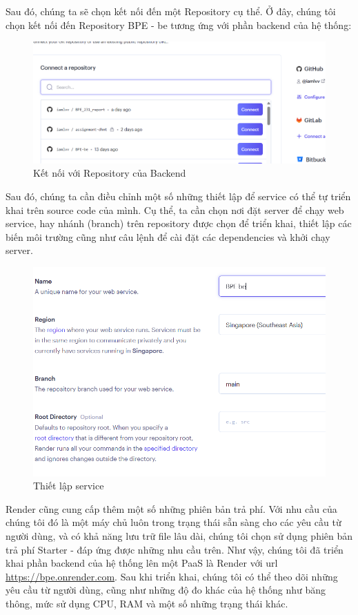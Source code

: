 Sau đó, chúng ta sẽ chọn kết nối đến một Repository cụ thể. Ở đây, chúng tôi chọn kết nối đến Repository BPE - be tương ứng với phần backend của hệ thống:
\begin{figure}[H]
    \centering
    \includegraphics[width=\linewidth]{Content/Hiện thực hệ thống/images/chooserepo.png}
    \caption{Kết nối với Repository của Backend}
    \label{fig:Kết nối với Repository của Backend}
\end{figure}
Sau đó, chúng ta cần điều chỉnh một số những thiết lập để service có thể tự triển khai trên source code của mình. Cụ thể, ta cần chọn nơi đặt server để chạy web service, hay nhánh (branch) trên repository được chọn để triển khai, thiết lập các biến môi trường cũng như câu lệnh để cài đặt các dependencies và khởi chạy server.
\begin{figure}[H]
    \centering
    \includegraphics[width=\linewidth]{Content/Hiện thực hệ thống/images/config.png}
    \caption{Thiết lập service}
    \label{fig:Thiết lập service}
\end{figure}
Render cũng cung cấp thêm một số những phiên bản trả phí. Với nhu cầu của chúng tôi đó là một máy chủ luôn trong trạng thái sẵn sàng cho các yêu cầu từ người dùng, và có khả năng lưu trữ file lâu dài, chúng tôi chọn sử dụng phiên bản trả phí Starter - đáp ứng được những nhu cầu trên.
\newline
Như vậy, chúng tôi đã triển khai phần backend của hệ thống lên một PaaS là Render với url \url{https://bpe.onrender.com}. Sau khi triển khai, chúng tôi có thể theo dõi những yêu cầu từ người dùng, cũng như những độ đo khác của hệ thống như băng thông, mức sử dụng CPU, RAM và một số những trạng thái khác.

